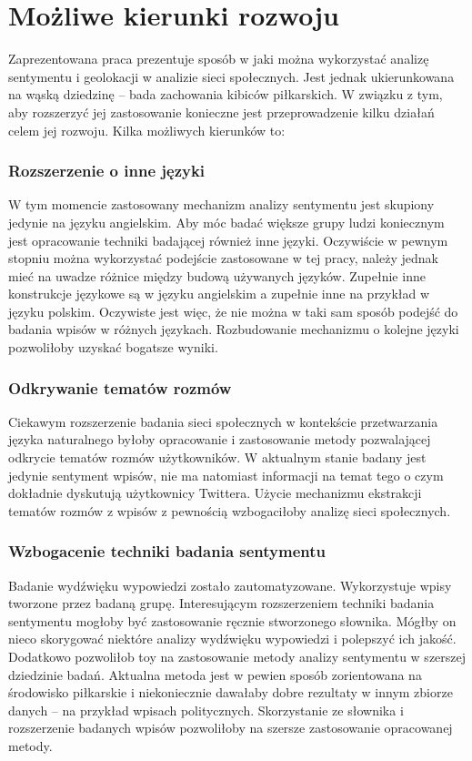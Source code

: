 \section{Możliwe kierunki rozwoju}

Zaprezentowana praca prezentuje sposób w jaki można wykorzystać
analizę sentymentu i geolokacji w analizie sieci społecznych. Jest jednak
ukierunkowana na wąską dziedzinę -- bada zachowania kibiców piłkarskich.
W związku z tym, aby rozszerzyć jej zastosowanie konieczne jest przeprowadzenie
kilku działań celem jej rozwoju. Kilka możliwych kierunków to:

\subsubsection{Rozszerzenie o inne języki}
W tym momencie zastosowany mechanizm analizy sentymentu jest skupiony jedynie na
języku angielskim. Aby móc badać większe grupy ludzi koniecznym jest opracowanie
techniki badającej również inne języki. Oczywiście w pewnym stopniu można 
wykorzystać podejście zastosowane w tej pracy, należy jednak mieć na uwadze
różnice między budową używanych języków. Zupełnie inne konstrukcje językowe
są w języku angielskim a zupełnie inne na przykład w języku polskim.
Oczywiste jest więc, że nie można w taki sam sposób podejść do badania
wpisów w różnych językach. Rozbudowanie mechanizmu o kolejne języki pozwoliłoby
uzyskać bogatsze wyniki.

\subsubsection{Odkrywanie tematów rozmów}
Ciekawym rozszerzenie badania sieci społecznych w kontekście przetwarzania
języka naturalnego byłoby opracowanie i zastosowanie metody pozwalającej
odkrycie tematów rozmów użytkowników. W aktualnym stanie badany jest jedynie
sentyment wpisów, nie ma natomiast informacji na temat tego o czym dokładnie
dyskutują użytkownicy Twittera. Użycie mechanizmu ekstrakcji tematów rozmów
z wpisów z pewnością wzbogaciłoby analizę sieci społecznych.


\subsubsection{Wzbogacenie techniki badania sentymentu}
Badanie wydźwięku wypowiedzi zostało zautomatyzowane. Wykorzystuje wpisy
tworzone przez badaną grupę. Interesującym rozszerzeniem techniki badania 
sentymentu mogłoby być zastosowanie ręcznie stworzonego słownika.
Mógłby on nieco skorygować niektóre analizy wydźwięku wypowiedzi i polepszyć
ich jakość. Dodatkowo pozwoliłob toy na zastosowanie metody analizy sentymentu
w szerszej dziedzinie badań. Aktualna metoda jest w pewien sposób zorientowana
na środowisko piłkarskie i niekoniecznie dawałaby dobre rezultaty w innym
zbiorze danych -- na przykład wpisach politycznych. Skorzystanie ze słownika
i rozszerzenie badanych wpisów pozwoliłoby na szersze zastosowanie opracowanej 
metody.

